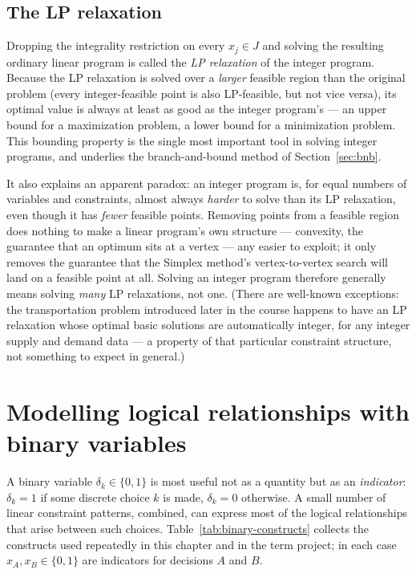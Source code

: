 \subsection{The LP relaxation}
\label{sec:lp-relaxation}

Dropping the integrality restriction on every $x_j\in J$ and solving the
resulting ordinary linear program is called the \emph{LP relaxation} of
the integer program. Because the LP relaxation is solved over a
\emph{larger} feasible region than the original problem (every
integer-feasible point is also LP-feasible, but not vice versa), its
optimal value is always at least as good as the integer program's --- an
upper bound for a maximization problem, a lower bound for a minimization
problem. This bounding property is the single most important tool in
solving integer programs, and underlies the branch-and-bound method of
Section~\ref{sec:bnb}.

It also explains an apparent paradox: an integer program is, for equal
numbers of variables and constraints, almost always \emph{harder} to
solve than its LP relaxation, even though it has \emph{fewer} feasible
points. Removing points from a feasible region does nothing to make a
linear program's own structure --- convexity, the guarantee that an
optimum sits at a vertex --- any easier to exploit; it only removes the
guarantee that the Simplex method's vertex-to-vertex search will land on
a feasible point at all. Solving an integer program therefore generally
means solving \emph{many} LP relaxations, not one. (There are well-known
exceptions: the transportation problem introduced later in the course
happens to have an LP relaxation whose optimal basic solutions are
automatically integer, for any integer supply and demand data --- a
property of that particular constraint structure, not something to expect
in general.)

\section{Modelling logical relationships with binary variables}
\label{sec:binary-modelling}

A binary variable $\delta_k\in\{0,1\}$ is most useful not as a quantity
but as an \emph{indicator}: $\delta_k=1$ if some discrete choice $k$ is
made, $\delta_k=0$ otherwise. A small number of linear constraint patterns,
combined, can express most of the logical relationships that arise
between such choices. Table~\ref{tab:binary-constructs} collects the
constructs used repeatedly in this chapter and in the term project; in
each case $x_A,x_B\in\{0,1\}$ are indicators for decisions $A$ and $B$.

